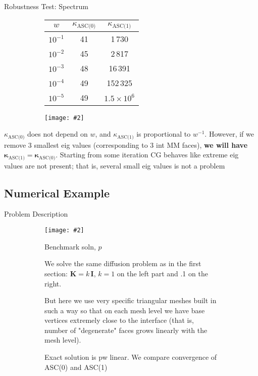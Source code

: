 \documentclass{beamer}
\newcommand{\includegraphicsw}[2][1.]{\texttt{[image: \#2]}}
\newcommand{\vect}[1]{\boldsymbol{\mathbf{#1}}}
\begin{document}
	\begin{frame}{Robustness Test: Spectrum}
		\begin{figure}
		\centering
		\caption{Condition Numbers of ASC(0)\,/\,ASC(1) Matrices} 
		\begin{subfigure}{.45\linewidth}
			\centering\footnotesize
			\begin{tabular}[1.2]{ | c | c | c | }
				\hline
				$w$ & $\kappa_{\text{ASC(0)}}$ & $\kappa_{\text{ASC(1)}}$ \\
				\hline
				$10^{-1}$ & 41 & 1\,730 \\ 
				\hline
				$10^{-2}$ & 45 & 2\,817 \\
				\hline
				$10^{-3}$ & 48 & 16\,391 \\
				\hline
				$10^{-4}$ & 49 & 152\,325 \\
				\hline
				$10^{-5}$ & 49 & $1.5\times10^6$ \\
				\hline
			\end{tabular}
		\end{subfigure}%
		\hfill
		\begin{subfigure}{.55\linewidth}
			\centering
			\includegraphicsw{logplot.png}
		\end{subfigure}
		\end{figure}
		$\kappa_{\text{ASC(0)}}$ does not depend on $w$, and $\kappa_{\text{ASC(1)}}$ is proportional to $w^{-1}$. However, if we remove 3 smallest eig values (corresponding to 3 int MM faces), \textbf{we will have $\vect\kappa_{\text{ASC(1)}} = \vect\kappa_{\text{ASC(0)}}$}.
		Starting from some iteration CG behaves like extreme eig values are not present; that is, several small eig values is not a problem 
	\end{frame}

	\subsection{Numerical Example}
	
	\begin{frame}{Problem Description}
		\begin{figure}
			\centering
			\begin{subfigure}{.4\linewidth}
				\centering
				\includegraphicsw{skew_ref.png}
				\caption{Benchmark soln, $p$}
			\end{subfigure}%
			\hfill
			\begin{subfigure}{.5\linewidth}
				\footnotesize{We solve the same diffusion problem as in the first section: $\vect K = k\,\vect I$, $k = 1$ on the left part and .1 on the right.
					
				\vspace{3mm} 
				But here we use very specific triangular meshes built in such a way so that on each mesh level we have base vertices extremely close to the interface (that is, number of "degenerate" faces grows linearly with the mesh level).
				
				\vspace{3mm}
				Exact solution is pw linear. We compare convergence of ASC(0) and ASC(1)}
			\end{subfigure}
		\end{figure}
	\end{frame}
\end{document}
